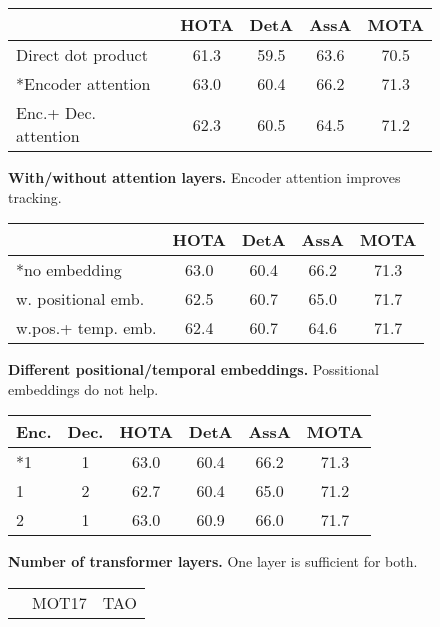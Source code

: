 \documentclass[10pt,twocolumn,letterpaper]{article}
\newcommand{\lbltbl}[1]{\label{tbl:#1}}
\begin{document}
\begin{table*}
\centering
\begin{subfigure}{0.49\linewidth}
\centering
\begin{tabular}{@{}l@{}c@{\ }c@{\ \ }c@{\ }c@{}}
\toprule
 & HOTA & DetA & AssA & MOTA \\
\midrule
Direct dot product & 61.3 & 59.5 & 63.6 & 70.5 \\
*Encoder attention  & 63.0 & 60.4 & 66.2 & 71.3 \\
Enc.+ Dec. attention & 62.3 & 60.5 & 64.5 & 71.2\\
\bottomrule
\end{tabular}
\caption{\scriptsize \textbf{With/without attention layers.}
Encoder attention improves tracking.}
\lbltbl{att}
\end{subfigure}
{
\begin{subfigure}{0.50\linewidth}
\centering
\begin{tabular}{@{}l@{}c@{\ }c@{\ \ }c@{\ }c@{}}
\toprule
 & HOTA & DetA & AssA & MOTA \\
\midrule
*no embedding & 63.0 & 60.4 & 66.2 & 71.3 \\
w. positional emb. & 62.5 & 60.7 & 65.0 & 71.7 \\
w.pos.+ temp. emb. & 62.4 & 60.7 & 64.6 & 71.7\\
\bottomrule
\end{tabular}
\caption{\scriptsize \textbf{Different positional/temporal embeddings.} Possitional embeddings do not help.}
\lbltbl{embedding}
\end{subfigure}
}
\begin{subfigure}{0.43 \linewidth}
\centering
\begin{tabular}{@{}l@{\ \ }c@{\ \ }c@{\ \ }c@{\ \ }c@{\ \ }c@{}}
\toprule
 Enc. & Dec. & HOTA & DetA & AssA & MOTA \\
\midrule
*1 & 1  & 63.0 & 60.4 & 66.2 & 71.3 \\
1 & 2 & 62.7 & 60.4 & 65.0 & 71.2 \\
2 & 1 & 63.0 & 60.9 & 66.0 & 71.7\\
\bottomrule
\end{tabular}
\caption{\scriptsize \textbf{Number of transformer layers.} One layer is sufficient for both.}
\lbltbl{layers}
\end{subfigure}
\begin{subfigure}{0.51\linewidth}
\centering
\begin{tabular}{@{}l@{}c@{\ \ }c@{\ \ }c@{\ \ }c@{\ \ }c@{}}
\toprule
& \multicolumn{4}{c}{MOT17} & \multicolumn{1}{c}{TAO} \\ 

\end{tabular}
\end{subfigure}
\end{table*}
\end{document}

